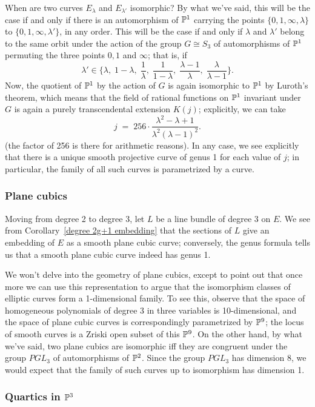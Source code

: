 When are two curves $E_\lambda$ and $E_{\lambda'}$ isomorphic? By what we've said, this will be the case if and only if there is an automorphism of ${\mathbb P}^1$ carrying the points $\{0,1,\infty,\lambda\}$ to $\{0,1,\infty,\lambda'\}$, in any order. This will be the case if and only if $\lambda$ and $\lambda'$ belong to the same orbit under the action of the group $G \cong S_3$ of automorphisms of ${\mathbb P}^1$ permuting the three points $0, 1$ and $\infty$; that is, if
$$
\lambda' \in \{\lambda, \; 1-\lambda, \; \frac{1}{\lambda},\;  \frac{1}{1-\lambda}, \; \frac{\lambda - 1}{\lambda}, \; \frac{\lambda}{\lambda - 1} \}.
$$
Now, the quotient of ${\mathbb P}^1$ by the action of $G$ is again isomorphic to ${\mathbb P}^1$ by Luroth's theorem, which means that the field of rational functions on ${\mathbb P}^1$ invariant under $G$ is again a purely transcendental extension $K(j)$; explicitly, we can take
$$
j \; = \; 256\cdot \frac{\lambda^2 - \lambda + 1}{\lambda^2(\lambda - 1)^2}.
$$
(the factor of 256 is there for arithmetic reasons). In any case, we see explicitly that there is a unique smooth projective curve of genus 1 for each value of $j$; in particular, the family of all such curves is parametrized by a curve.

\subsubsection{Plane cubics}

Moving from degree 2 to degree 3, let $L$ be a line bundle of degree 3 on $E$. We see from Corollary~\ref{degree 2g+1 embedding} that the sections of $L$ give an embedding of $E$ as a smooth plane cubic curve; conversely, the genus formula tells us that a smooth plane cubic curve indeed has genus 1. 

We won't delve into the geometry of plane cubics, except to point out that once more we can use this representation to argue that the isomorphism classes of elliptic curves form a 1-dimensional family. To see this, observe that the space of homogeneous polynomials of degree 3 in three variables is 10-dimensional, and the space of plane cubic curves is correspondingly parametrized by  ${\mathbb P}^9$; the locus of smooth curves is a Zriski open subset of this ${\mathbb P}^9$. On the other hand, by what we've said, two plane cubics are isomorphic iff they are congruent under the group $PGL_3$ of automorphisms of ${\mathbb P}^2$. Since the group $PGL_3$ has dimension 8, we would expect that the family of such curves up to isomorphism has dimension 1.

\subsubsection{Quartics in ${\mathbb P}^3$} 

